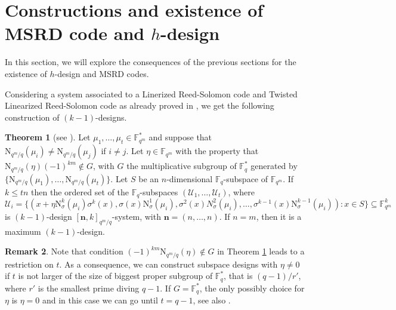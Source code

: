 \documentclass[11pt]{amsart}
\theoremstyle{definition}
\newtheorem{theorem}{Theorem}[section]
\newtheorem{remark}[theorem]{Remark}
\newcommand{\F}{{\mathbb F}}
\newcommand{\U}{{\mathcal{U}}}
\newcommand{\bfn}{\mathbf {n}}
\newcommand{\fq}{{\mathbb F}_{q}}
\newcommand{\N}{\mathrm{N}}
\begin{document}
\section{Constructions and existence of MSRD code and \texorpdfstring{$h$}{Lg}-design}

In this section, we will explore the consequences of the previous sections for the existence of $h$-design and MSRD codes.

Considering a system associated to a Linerized Reed-Solomon code and Twisted Linearized Reed-Solomon code as already proved in \cite{santonastaso2022subspace,neri2023geometry}, we get the following construction of $(k-1)$-designs.

\begin{theorem} [see \textnormal{\cite[Theorem 5.2]{santonastaso2022subspace} \cite[Proposition 4.3]{neri2023geometry}}] 
\label{th:example2(n-1)des}
     Let $\mu_1,\ldots,\mu_{t} \in \F_{q^m}^*$ and suppose that $\N_{q^m/q}(\mu_i) \neq \N_{q^m/q}(\mu_j)$ if $i \neq j$. Let $\eta \in \F_{q^m}$ with the property that $\N_{q^m/q}(\eta)(-1)^{km} \notin G$, with $G$ the multiplicative subgroup of $\F_{q}^*$ generated by $\{\N_{q^m/q}(\mu_1),\ldots,\N_{q^m/q}(\mu_t)\}$. Let $S$ be an $n$-dimensional $\F_q$-subspace of $\F_{q^m}$. If $k\leq tn$ then 
    the ordered set of the $\fq$-subspaces $(\U_1,\ldots,\U_{t})$, where
    \[
    \U_i=\{ (x+\eta \N_{\sigma}^k(\mu_i)\sigma^k(x),\sigma(x)\N_{\sigma}^1(\mu_i),\sigma^2(x)N_{\sigma}^2(\mu_i),\ldots, \sigma^{k-1}(x)\N_{\sigma}^{k-1}(\mu_i)) \colon x \in  S\} \subseteq \F_{q^m}^k
    \]
    is $(k-1)$-design $[\bfn,k]_{q^m/q}$-system, with $\bfn=(n,\ldots,n)$. If $n=m$, then it is a maximum $(k-1)$-design.
\end{theorem}
\medskip 


\medskip 
\begin{remark}
Note that condition $(-1)^{km}\N_{q^m/q}(\eta) \notin G$ in Theorem \ref{th:example2(n-1)des} leads to a restriction on $t$. As a consequence, we can construct subspace designs with $\eta \neq 0$ if $t$ is not larger of the size of biggest proper subgroup of $\F_{q}^*$, that is $(q-1)/r'$, where $r'$ is the smallest prime diving $q-1$.
If $G=\F_{q}^*$, the only possibly choice for $\eta$ is $\eta=0$ and in this case we can go until $t=q-1$, see also \cite[Proposition 6.8]{neri2022twisted}.
\end{remark}
\end{document}
